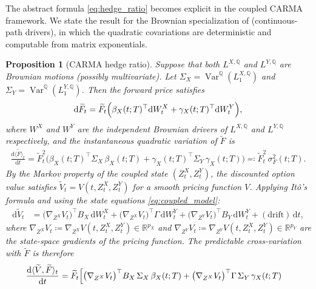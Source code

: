\documentclass[10pt,a4paper,reqno]{amsart}
\newtheorem{proposition}[theorem]{Proposition}
\newcommand{\R}{\mathbb{R}}
\newcommand{\Q}{\mathbb{Q}}
\newcommand{\1}{\mathbbm{1}}
\newcommand{\dd}{\mathrm{d}}
\DeclareMathOperator{\Var}{Var}
\begin{document}
The abstract formula \eqref{eq:hedge_ratio} becomes explicit in the coupled
CARMA framework. We state the result for the Brownian specialization of
 (continuous-path drivers), in which the
quadratic covariations are deterministic and computable from matrix
exponentials.

\begin{proposition}[CARMA hedge ratio]
\label{prop:carma_hedge_ratio}
Suppose that both $L^{X,\Q}$ and $L^{Y,\Q}$ are Brownian motions (possibly
multivariate). Let $\Sigma_X = \Var^\Q(L_1^{X,\Q})$ and
$\Sigma_Y = \Var^\Q(L_1^{Y,\Q})$. Then the forward price satisfies
\begin{align}\label{eq:forward_brownian_sde}
\dd \widetilde{F}_t
= \widetilde{F}_t\Bigl(
    \beta_X(t;T)^\top \dd W_t^{X}
    + \gamma_X(t;T)^\top \dd W_t^{Y}
  \Bigr),
\end{align}
where $W^X$ and $W^Y$ are the independent Brownian drivers of $L^{X,\Q}$ and
$L^{Y,\Q}$ respectively, and the instantaneous quadratic variation of
$\widetilde{F}$ is
\begin{align}\label{eq:forward_qv}
  \frac{\dd \langle \widetilde{F} \rangle_t}{\dd t}
  = \widetilde{F}_t^2 \bigl(
      \beta_X(t;T)^\top \Sigma_X\, \beta_X(t;T)
      + \gamma_X(t;T)^\top \Sigma_Y\, \gamma_X(t;T)
    \bigr) \eqqcolon \widetilde{F}_t^2\, \sigma_F^2(t;T).
\end{align}
By the Markov property of the coupled state $(Z_t^X, Z_t^Y)$, the discounted
option value satisfies $\widetilde{V}_t = V(t, Z_t^X, Z_t^Y)$ for a smooth
pricing function $V$. Applying It\^o's formula and using the state equations
\eqref{eq:coupled_model}:
\begin{align}\label{eq:option_ito}
  \dd\widetilde{V}_t
  &= \bigl(\nabla_{Z^X} V_t\bigr)^\top B_X\,\dd W_t^{X}
     + \bigl(\nabla_{Z^X} V_t\bigr)^\top \Gamma\,\dd W_t^{Y}
     + \bigl(\nabla_{Z^Y} V_t\bigr)^\top B_Y\,\dd W_t^{Y}
     + (\text{drift})\,\dd t,
\end{align}
where $\nabla_{Z^X} V_t \coloneqq \nabla_{Z^X} V(t,Z_t^X,Z_t^Y) \in
\R^{p_X}$ and $\nabla_{Z^Y} V_t \coloneqq \nabla_{Z^Y} V(t,Z_t^X,Z_t^Y) \in
\R^{p_Y}$ are the state-space gradients of the pricing function.
The predictable cross-variation with $\widetilde{F}$ is therefore
\begin{align}\label{eq:cross_var_explicit}
  \frac{\dd\langle \widetilde{V}, \widetilde{F} \rangle_t}{\dd t}
  &= \widetilde{F}_t\Bigl[
       \bigl(\nabla_{Z^X} V_t\bigr)^\top B_X\,\Sigma_X\,\beta_X(t;T)
       + \bigl(\nabla_{Z^X} V_t\bigr)^\top \Gamma\,\Sigma_Y\,\gamma_X(t;T)

\end{align}
\end{proposition}
\end{document}
